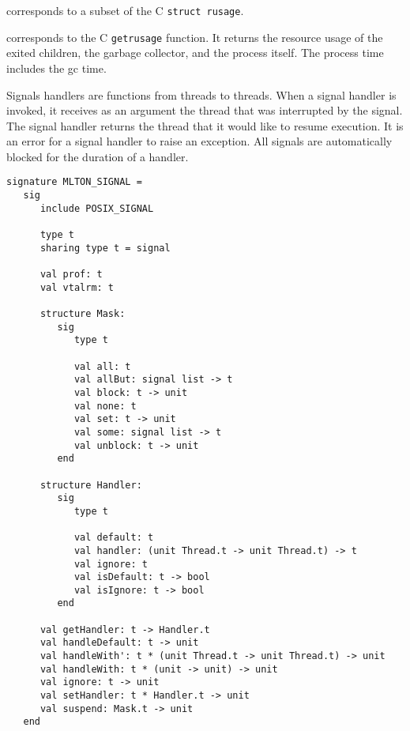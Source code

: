\begin{description}
corresponds to a subset of the C {\tt struct rusage}.

corresponds to the C {\tt getrusage} function.  It returns the resource usage of
the exited children, the garbage collector, and the process itself.  The process
time includes the gc time.
\end{description}

Signals handlers are functions from threads to threads.  When a signal 
handler is invoked, it receives as an argument the thread that was
interrupted by the signal.  The signal handler returns the thread that 
it would like to resume execution.  It is an error for a signal
handler to raise an exception.  All signals are automatically blocked
for the duration of a handler.

\begin{verbatim}
signature MLTON_SIGNAL =
   sig
      include POSIX_SIGNAL

      type t
      sharing type t = signal

      val prof: t
      val vtalrm: t

      structure Mask:
         sig
            type t
               
            val all: t
            val allBut: signal list -> t
            val block: t -> unit
            val none: t
            val set: t -> unit
            val some: signal list -> t
            val unblock: t -> unit
         end

      structure Handler:
         sig
            type t

            val default: t
            val handler: (unit Thread.t -> unit Thread.t) -> t
            val ignore: t
            val isDefault: t -> bool
            val isIgnore: t -> bool
         end

      val getHandler: t -> Handler.t
      val handleDefault: t -> unit
      val handleWith': t * (unit Thread.t -> unit Thread.t) -> unit
      val handleWith: t * (unit -> unit) -> unit
      val ignore: t -> unit
      val setHandler: t * Handler.t -> unit
      val suspend: Mask.t -> unit
   end
\end{verbatim}

